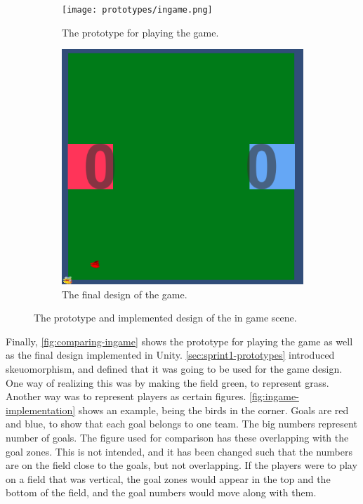 \begin{figure}[H]
    \centering
    \begin{subfigure}{0.45\textwidth}
        \centering
        \texttt{[image: prototypes/ingame.png]}
        \caption{The prototype for playing the game.}
        \label{fig:ingame-prototype}
    \end{subfigure}
    \begin{subfigure}{0.45\textwidth}
        \centering
        \includegraphics[width=0.8\linewidth]{figures/sprint-4-game.PNG}
        \caption{The final design of the game.}
        \label{fig:ingame-implementation}
    \end{subfigure}
    \caption{The prototype and implemented design of the in game scene.}
    \label{fig:comparing-ingame}
\end{figure}
\noindent
Finally, \autoref{fig:comparing-ingame} shows the prototype for playing the game as well as the final design implemented in Unity.
\autoref{sec:sprint1-prototypes} introduced skeuomorphism, and defined that it was going to be used for the game design.
One way of realizing this was by making the field green, to represent grass.
Another way was to represent players as certain figures.
\autoref{fig:ingame-implementation} shows an example, being the birds in the corner.
Goals are red and blue, to show that each goal belongs to one team.
The big numbers represent number of goals.
The figure used for comparison has these overlapping with the goal zones.
This is not intended, and it has been changed such that the numbers are on the field close to the goals, but not overlapping.
If the players were to play on a field that was vertical, the goal zones would appear in the top and the bottom of the field, and the goal numbers would move along with them.

